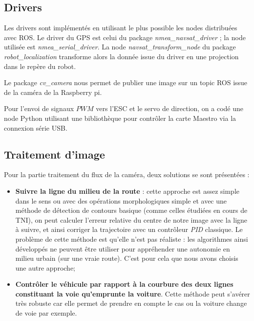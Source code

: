 \documentclass[12pt, openany]{report}
\begin{document}
\subsection{Drivers}
Les drivers sont implémentés en utilisant le plus possible les nodes distribuées avec ROS. Le driver du GPS est celui du package \emph{nmea\_navsat\_driver} ;
la node utilisée est \emph{nmea\_serial\_driver}. La node \emph{navsat\_transform\_node} du package \emph{robot\_localization} transforme alors la donnée
issue du driver en une projection dans le repère du robot.

Le package \emph{cv\_camera} nous permet de publier une image sur un topic ROS issue de la caméra de la Raspberry pi.

Pour l'envoi de signaux $PWM$ vers l'ESC et le servo de direction, on a codé une node Python utilisant une bibliothèque pour contrôler la carte Maestro via
la connexion série USB.



\subsection{Traitement d'image}
Pour la partie traitement du flux de la caméra, deux solutions se sont présentées : 
\begin{itemize}
    \item \textbf{Suivre la ligne du milieu de la route} : cette approche est assez simple dans le sens ou avec des opérations morphologiques simple et avec une méthode de détection de contours basique (comme celles étudiées en cours de TNI), on peut calculer l'erreur relative du centre de notre image avec la ligne à suivre, et ainsi corriger la trajectoire avec un contrôleur \emph{PID} classique. Le problème de cette méthode est qu'elle n'est pas réaliste : les algorithmes ainsi développés ne peuvent être utiliser pour appréhender une autonomie en milieu urbain (sur une vraie route). C'est pour cela que nous avons choisis une autre approche;
    \item \textbf{Contrôler le véhicule par rapport à la courbure des deux lignes constituant la voie qu'emprunte la voiture}. Cette méthode peut s'avérer très robuste car elle permet de prendre en compte le cas ou la voiture change de voie par exemple. \\
\end{itemize}
\end{document}
